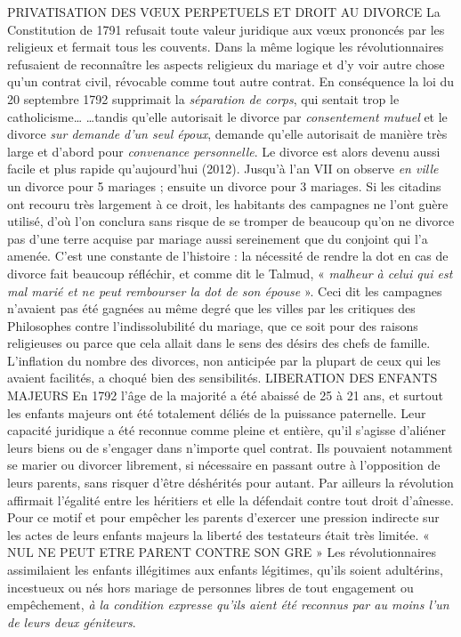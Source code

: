 PRIVATISATION DES VŒUX PERPETUELS ET DROIT AU DIVORCE
 La Constitution de 1791 refusait toute valeur juridique aux vœux prononcés par les religieux et fermait tous les couvents. Dans la même logique les révolutionnaires refusaient de reconnaître les aspects religieux du mariage et d'y voir autre chose qu'un contrat civil, révocable comme tout autre contrat. En conséquence la loi du 20 septembre 1792 supprimait la \emph{séparation de corps}, qui sentait trop le catholicisme…
 …tandis qu'elle autorisait le divorce par \emph{consentement mutuel} et le divorce \emph{sur demande d'un seul époux}, demande qu'elle autorisait de manière très large et d'abord pour \emph{convenance personnelle}. 
 Le divorce est alors devenu aussi facile et plus rapide qu'aujourd'hui (2012). Jusqu'à l'an VII on observe \emph{en ville} un divorce pour 5 mariages ; ensuite un divorce pour 3 mariages. Si les citadins ont recouru très largement à ce droit, les habitants des campagnes ne l'ont guère utilisé, d'où l'on conclura sans risque de se tromper de beaucoup qu'on ne divorce pas d'une terre acquise par mariage aussi sereinement que du conjoint qui l'a amenée. C'est une constante de l'histoire : la nécessité de rendre la dot en cas de divorce fait beaucoup réfléchir, et comme dit le Talmud, « \emph{malheur à celui qui est mal marié et ne peut rembourser la dot de son épouse} ». Ceci dit les campagnes n'avaient pas été gagnées au même degré que les villes par les critiques des Philosophes contre l'indissolubilité du mariage, que ce soit pour des raisons religieuses ou parce que cela allait dans le sens des désirs des chefs de famille. 
 L'inflation du nombre des divorces, non anticipée par la plupart de ceux qui les avaient facilités, a choqué bien des sensibilités.
LIBERATION DES ENFANTS MAJEURS
 En 1792 l'âge de la majorité a été abaissé de 25 à 21 ans, et surtout les enfants majeurs ont été totalement déliés de la puissance paternelle. Leur capacité juridique a été reconnue comme pleine et entière, qu'il s'agisse d'aliéner leurs biens ou de s'engager dans n'importe quel contrat. Ils pouvaient notamment se marier ou divorcer librement, si nécessaire en passant outre à l'opposition de leurs parents, sans risquer d'être déshérités pour autant. 
 Par ailleurs la révolution affirmait l'égalité entre les héritiers et elle la défendait contre tout droit d'aînesse. Pour ce motif et pour empêcher les parents d'exercer une pression indirecte sur les actes de leurs enfants majeurs la liberté des testateurs était très limitée.
« NUL NE PEUT ETRE PARENT CONTRE SON GRE » 
 Les révolutionnaires assimilaient les enfants illégitimes aux enfants légitimes, qu'ils soient adultérins, incestueux ou nés hors mariage de personnes libres de tout engagement ou empêchement, \emph{à la condition expresse qu'ils aient été reconnus par au moins l'un de leurs deux géniteurs}. 
